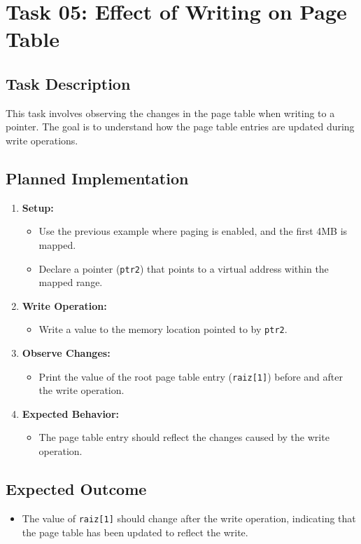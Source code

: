 \documentclass[a4paper,12pt]{report}
\begin{document}
\chapter{Task 05: Effect of Writing on Page Table}

\section{Task Description}
This task involves observing the changes in the page table when writing to a pointer. The goal is to understand how the page table entries are updated during write operations.

\section{Planned Implementation}
\begin{enumerate}
    \item \textbf{Setup:}
    \begin{itemize}
        \item Use the previous example where paging is enabled, and the first 4MB is mapped.
        \item Declare a pointer (\texttt{ptr2}) that points to a virtual address within the mapped range.
    \end{itemize}
    \item \textbf{Write Operation:}
    \begin{itemize}
        \item Write a value to the memory location pointed to by \texttt{ptr2}.
    \end{itemize}
    \item \textbf{Observe Changes:}
    \begin{itemize}
        \item Print the value of the root page table entry (\texttt{raiz[1]}) before and after the write operation.
    \end{itemize}
    \item \textbf{Expected Behavior:}
    \begin{itemize}
        \item The page table entry should reflect the changes caused by the write operation.
    \end{itemize}
\end{enumerate}

\section{Expected Outcome}
\begin{itemize}
    \item The value of \texttt{raiz[1]} should change after the write operation, indicating that the page table has been updated to reflect the write.
\end{itemize}
\end{document}
